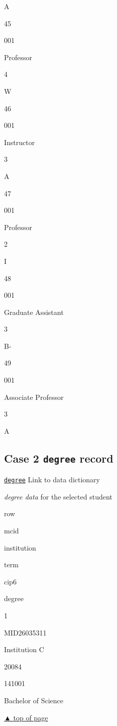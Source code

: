 \documentclass[
]{book}
\begin{document}
A

45

001

Professor

4

W

46

001

Instructor

3

A

47

001

Professor

2

I

48

001

Graduate Assistant

3

B-

49

001

Associate Professor

3

A

\hypertarget{case-2-degree-record}{%
\subsection{\texorpdfstring{Case 2 \texttt{degree} record}{Case 2 degree record}}\label{case-2-degree-record}}

\href{https://midfieldr.github.io/midfielddata/reference/degree.html}{\texttt{degree}} Link to data dictionary

\emph{degree data} for the selected student

row

mcid

institution

term

cip6

degree

1

MID26035311

Institution C

20084

141001

Bachelor of Science

\protect\hyperlink{explore-the-data}{▲ top of page}

  
\end{document}
